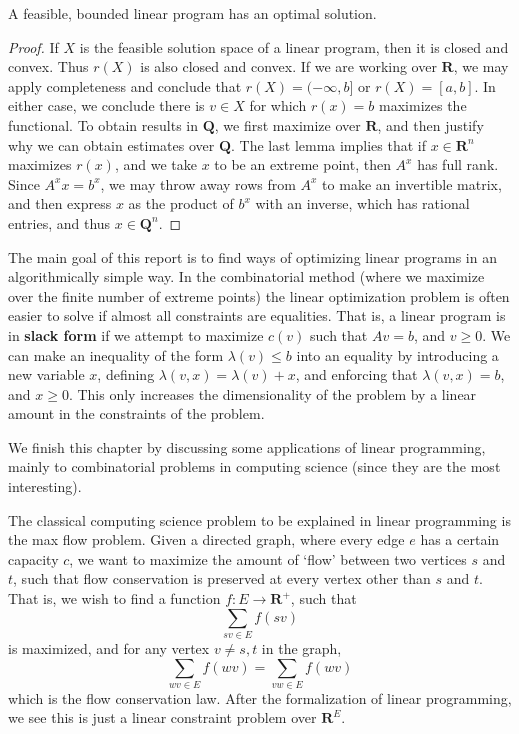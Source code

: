     \begin{theorem}
        A feasible, bounded linear program has an optimal solution.
    \end{theorem}
    \begin{proof}
        If $X$ is the feasible solution space of a linear program, then it is closed and convex. Thus $r(X)$ is also closed and convex. If we are working over $\mathbf{R}$, we may apply completeness and conclude that $r(X) = (-\infty,b]$ or $r(X) = [a,b]$. In either case, we conclude there is $v \in X$ for which $r(x) = b$ maximizes the functional. To obtain results in $\mathbf{Q}$, we first maximize over $\mathbf{R}$, and then justify why we can obtain estimates over $\mathbf{Q}$. The last lemma implies that if $x \in \mathbf{R}^n$ maximizes $r(x)$, and we take $x$ to be an extreme point, then $A^x$ has full rank. Since $A^x x = b^x$, we may throw away rows from $A^x$ to make an invertible matrix, and then express $x$ as the product of $b^x$ with an inverse, which has rational entries, and thus $x \in \mathbf{Q}^n$.
    \end{proof}

    The main goal of this report is to find ways of optimizing linear programs in an algorithmically simple way. In the combinatorial method (where we maximize over the finite number of extreme points) the linear optimization problem is often easier to solve if almost all constraints are equalities. That is, a linear program is in {\bf slack form} if we attempt to maximize $c(v)$ such that $Av = b$, and $v \geq 0$. We can make an inequality of the form $\lambda(v) \leq b$ into an equality by introducing a new variable $x$, defining $\lambda(v,x) = \lambda(v) + x$, and enforcing that $\lambda(v,x) = b$, and $x \geq 0$. This only increases the dimensionality of the problem by a linear amount in the constraints of the problem.

    We finish this chapter by discussing some applications of linear programming, mainly to combinatorial problems in computing science (since they are the most interesting).

    \begin{example}
        The classical computing science problem to be explained in linear programming is the max flow problem. Given a directed graph, where every edge $e$ has a certain capacity $c$, we want to maximize the amount of `flow' between two vertices $s$ and $t$, such that flow conservation is preserved at every vertex other than $s$ and $t$. That is, we wish to find a function $f: E \to \mathbf{R}^+$, such that
        \[ \sum_{sv \in E} f(sv) \]
        is maximized, and for any vertex $v \neq s,t$ in the graph,
        \[ \sum_{wv \in E} f(wv) = \sum_{vw \in E} f(wv) \]
        which is the flow conservation law. After the formalization of linear programming, we see this is just a linear constraint problem over $\mathbf{R}^E$.
    \end{example}

